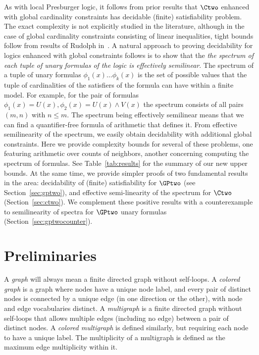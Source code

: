 As with local Presburger logic, it follows from prior results  that $\Ctwo$ enhanced with global cardinality constraints has decidable (finite) satisfiability problem.
The exact complexity is not explicitly studied in the literature,  although in the case of global cardinality constraints consisting of linear inequalities, tight bounds follow from results of Rudolph in~\cite{rudolphcardinality}.    A natural approach to proving decidability for logics
enhanced with global constraints follows is to show that the \emph{the spectrum of each tuple of unary formulas of the logic is effectively semilinear}. The spectrum of a tuple of unary formulas $\phi_1(x) \ldots \phi_k(x)$ is the set of possible values that the tuple of cardinalities of the satisfiers of the formula can have within a finite model. For example, for the pair of formulas $\phi_1(x)=U(x), \phi_2(x)= U(x) \wedge V(x)$ the spectrum consists of all pairs $(m, n)$ with $n \leq m$. The spectrum being effectively semilinear means that we can find a quantifier-free formula of arithmetic that defines it. From effective semilinearity of the spectrum, we easily obtain decidability with additional global constraints.
Here we provide  complexity bounds for several of these problems, one featuring  arithmetic over counts of neighbors, another concerning computing the spectrum of formulas. 
See Table~\ref{tab:results} for the summary of our new upper bounds.
At the same time, we provide simpler proofs of two fundamental results in the area: decidability of (finite) satisfiability for $\GPtwo$ (see Section~\ref{sec:gptwo}), and effective semi-linearity of the spectrum for $\Ctwo$ (Section~\ref{sec:ctwo}). We complement these positive results with a counterexample to semilinearity of spectra for $\GPtwo$ unary formulas (Section~\ref{sec:gptwocounter}).

\section{Preliminaries} \label{sec:prelims}

 A \emph{graph} will always mean a finite directed graph without self-loops.
A \emph{colored graph} is a graph where nodes have a unique node label, and every pair of distinct nodes is connected by a unique edge (in one direction or the other), with node and edge vocabularies distinct.
A \emph{multigraph} is a finite directed graph without self-loops that allows multiple edges (including no edge) between a pair of distinct nodes.
A \emph{colored multigraph} is defined similarly, but requiring each node to have a unique label.
The multiplicity of a multigraph is defined as the maximum edge multiplicity within it.

